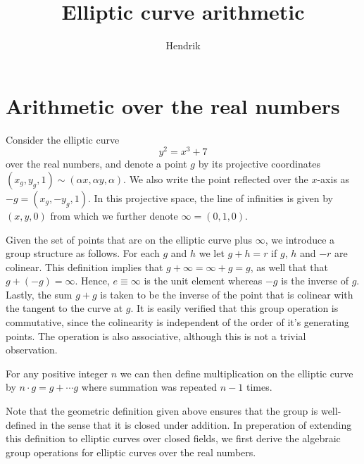 \documentclass{article}
\title{Elliptic curve arithmetic}
\author{Hendrik}
\begin{document}
\maketitle

\section{Arithmetic over the real numbers}

Consider the elliptic curve 
\begin{equation} \label{eq:elliptic_curve} y^2 =
    x^3 + 7 
\end{equation} 
over the real numbers, and denote a point $g$ by its projective coordinates
$(x_g, y_g, 1) \sim (\alpha x, \alpha y, \alpha)$. We also write the point
reflected over the $x$-axis as $-g = (x_g, -y_g, 1)$. In this projective space,
the line of infinities is given by $(x, y, 0)$ from which we further denote
$\infty = (0, 1, 0)$.

Given the set of points that are on the elliptic curve plus $\infty$, we
introduce a group structure as follows. For each $g$ and $h$ we let $g + h = r$
if $g$, $h$ and $-r$ are colinear. This definition implies that $g + \infty =
\infty + g = g$, as well that that $g + (-g) = \infty$. Hence, $e \equiv \infty$
is the unit element whereas $-g$ is the inverse of $g$. Lastly, the
sum $g + g$ is taken to be the inverse of the point that is colinear with the
tangent to the curve at $g$.  It is easily verified that this group operation is
commutative, since the colinearity is independent of the order of it's
generating points. The operation is also associative, although this is not a
trivial observation. 

For any positive integer $n$ we can then define multiplication on the elliptic
curve by $n \cdot g = g + \cdots g$ where summation was repeated $n - 1$ times.

Note that the geometric definition given above ensures that the group is
well-defined in the sense that it is closed under addition. In preperation of
extending this definition to elliptic curves over closed fields, we first
derive the algebraic group operations for elliptic curves over the real numbers.
\end{document}
